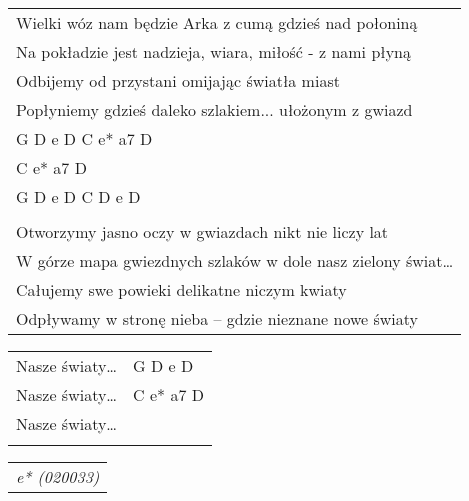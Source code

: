 \documentclass[a5paper]{article}
\begin{document}
\noindent
\begin{tabular}{@{}p{9.50cm}@{}}
Wielki wóz nam będzie Arka z cumą gdzieś nad połoniną \\
Na pokładzie jest nadzieja, wiara, miłość -  z nami płyną \\
Odbijemy od przystani omijając światła miast \\
Popłyniemy gdzieś daleko szlakiem... ułożonym z gwiazd \\
G D e D C e* a7 D \\
C e* a7 D \\
G D e D C D e D \\ \\

Otworzymy jasno oczy w gwiazdach nikt nie liczy lat \\
W górze mapa gwiezdnych szlaków w dole nasz zielony świat… \\
Całujemy swe powieki delikatne niczym kwiaty \\
Odpływamy w stronę nieba – gdzie nieznane nowe światy \\
\end{tabular}

\noindent
\begin{tabular}{@{}p{9.50cm}p{3cm}@{}}
Nasze światy… & G D e D \\
Nasze światy… & C e* a7 D \\
Nasze światy… & \\ \\
\end{tabular}

\noindent
\begin{tabular}{@{}p{9.50cm}@{}}
\emph{e* (020033)}
\end{tabular}
\end{document}
